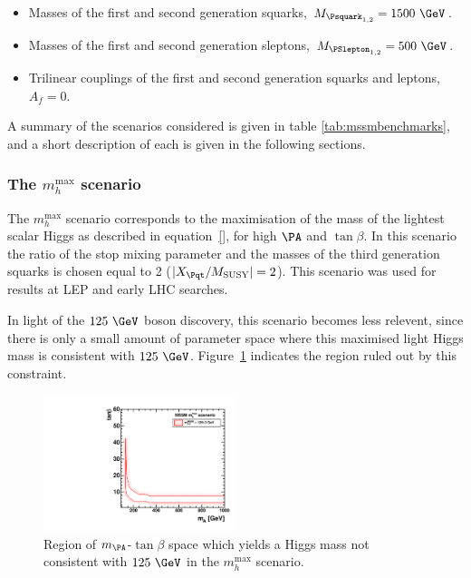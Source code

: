 \begin{itemize}
\item Masses of the first and second generation squarks, $M_{\Psquark_{1,2}} =
1500~\GeV$.
\item Masses of the first and second generation sleptons,  $M_{\PSlepton_{1,2}}
= 500~\GeV$.
\item Trilinear couplings of the first and second generation squarks and
leptons, $A_{f} = 0$.
\end{itemize}

A summary of the scenarios considered is given in table
\ref{tab:mssmbenchmarks}, and a short description of each is given in the
following sections.

\subsubsection{The $m_{h}^{\text{max}}$ scenario}
\label{sec:mhmaxscenario}

The $m_{h}^{\text{max}}$ scenario corresponds to the maximisation of the mass of
the lightest scalar Higgs as described in equation~\ref{}, for high $\PA$ and
$\tan\beta$. In this scenario the ratio of the stop mixing parameter and the
masses of the third generation squarks is chosen equal to 2
($|X_{\Pqt}/M_{\text{SUSY}}| = 2$). This scenario was used for results at LEP
and early LHC searches. 

In light of the $125~\GeV$ boson discovery, this scenario becomes less relevent,
since there is only a small amount of parameter space where this maximised light
Higgs mass is consistent with $125~\GeV$. Figure~\ref{fig:mhmaxmass} indicates
the region ruled out by this constraint. 

\begin{figure}[htbp]
   \includegraphics[width=0.5\textwidth]{plots/theory/cmb_mhmax-HypoTest.pdf}
\caption{Region of $m_{\PA}$-$\tan\beta$ space which yields a Higgs mass not
consistent with $125~\GeV$ in the $m_{h}^{\text{max}}$ scenario.}
\label{fig:mhmaxmass}
\end{figure}


